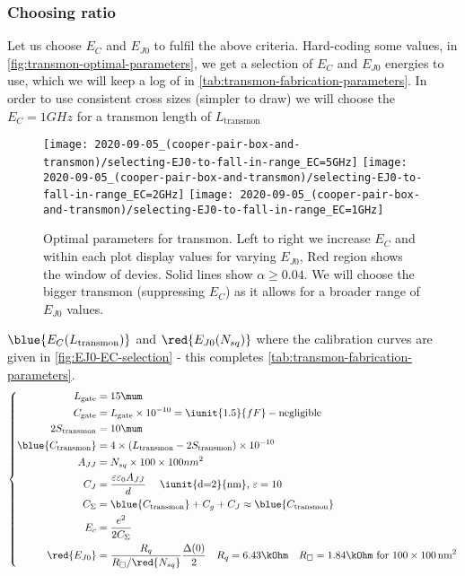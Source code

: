 \subsubsection{Choosing ratio}
Let  us choose  $E_C$  and  $E_{J0}$ to  fulfil  the above  criteria.
Hard-coding               some               values,               in
\autoref{fig:transmon-optimal-parameters},  we  get  a  selection  of
$E_C$ and $E_{J0}$  energies to use, which  we will keep a  log of in
\autoref{tab:transmon-fabrication-parameters}.    In  order   to  use
consistent  cross  sizes  (simpler  to   draw)  we  will  choose  the
$E_C=1GHz$ for a transmon length of $L_{\text{transmon}}$

\begin{figure}[h]
  \centering
  \texttt{[image: 2020-09-05\_(cooper-pair-box-and-transmon)/selecting-EJ0-to-fall-in-range\_EC=5GHz]}%
  \texttt{[image: 2020-09-05\_(cooper-pair-box-and-transmon)/selecting-EJ0-to-fall-in-range\_EC=2GHz]}%
  \texttt{[image: 2020-09-05\_(cooper-pair-box-and-transmon)/selecting-EJ0-to-fall-in-range\_EC=1GHz]}%
  \caption{\small Optimal parameters for  transmon.  Left to right we
    increase $E_C$  and within each  plot display values  for varying
    $E_{J0}$, Red  region shows  the window  of devies.   Solid lines
    show  $\alpha \ge  0.04$.   We will  choose  the bigger  transmon
    (suppressing $E_C$) as it allows  for a broader range of $E_{J0}$
    values.\label{fig:transmon-optimal-parameters}}
\end{figure}

\begin{framed}\noindent
  $\blue{E_C(L_{\text{transmon}})}$ and  $\red{E_{J0}(N_{sq})}$ where
  the calibration curves  are given in \autoref{fig:EJ0-EC-selection}
  - this completes \autoref{tab:transmon-fabrication-parameters}.
  \begin{equation}
    \left\{
      \begin{aligned}
        L_\text{gate} & = 15\mum\\
        C_{\text{gate}} & = L_\text{gate} \times 10^{-10} = \iunit{1.5}{fF} - \text{negligible}\\
        2S_{\text{transmon}} & = 10\mum \\
        \blue{C_{\text{transmon}}} & = 4\times\left( L_{\text{transmon}} - 2S_{\text{transmon}} \right) \times 10^{-10} \\
        A_{JJ} &  = N_{sq} \times 100\times100nm^{2} \\
        C_J & = \frac{\varepsilon\varepsilon_0A_{JJ}}{d} \quad \text{
          \iunit{d=2}{nm}, $\varepsilon = 10$}\\
        C_{\Sigma} & = \blue{C_\text{transmon}} + C_g + C_J \approx \blue{C_\text{transmon}}\\
        E_c& = \frac{e^2}{2C_\Sigma}\\
        \red{E_{J0}} & = \frac{R_q}{R_{\square}/\red{N_{sq}}}\frac{\Delta(0)}{2} \quad R_q=6.43\kOhm \quad R_{\square} = 1.84\kOhm \text{ for } 100 \times 100\,\text{nm}^2\\
      \end{aligned}\right.
  \end{equation}
\end{framed}

